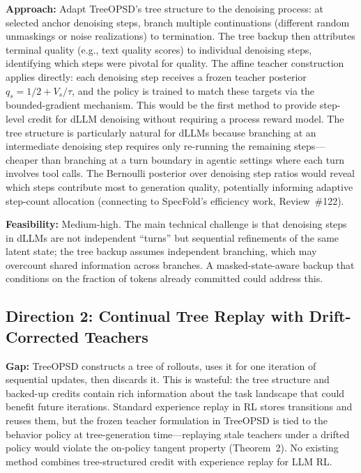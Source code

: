 \documentclass[11pt,a4paper]{article}
\begin{document}
\textbf{Approach:} Adapt TreeOPSD's tree structure to the denoising process: at selected anchor denoising steps, branch multiple continuations (different random unmaskings or noise realizations) to termination. The tree backup then attributes terminal quality (e.g., text quality scores) to individual denoising steps, identifying which steps were pivotal for quality. The affine teacher construction applies directly: each denoising step receives a frozen teacher posterior $q_s = 1/2 + V_s/\tau$, and the policy is trained to match these targets via the bounded-gradient mechanism. This would be the first method to provide step-level credit for dLLM denoising without requiring a process reward model. The tree structure is particularly natural for dLLMs because branching at an intermediate denoising step requires only re-running the remaining steps---cheaper than branching at a turn boundary in agentic settings where each turn involves tool calls. The Bernoulli posterior over denoising step ratios would reveal which steps contribute most to generation quality, potentially informing adaptive step-count allocation (connecting to SpecFold's efficiency work, Review~\#122).

\textbf{Feasibility:} Medium-high. The main technical challenge is that denoising steps in dLLMs are not independent ``turns'' but sequential refinements of the same latent state; the tree backup assumes independent branching, which may overcount shared information across branches. A masked-state-aware backup that conditions on the fraction of tokens already committed could address this.

\subsection{Direction 2: Continual Tree Replay with Drift-Corrected Teachers}
\textbf{Gap:} TreeOPSD constructs a tree of rollouts, uses it for one iteration of sequential updates, then discards it. This is wasteful: the tree structure and backed-up credits contain rich information about the task landscape that could benefit future iterations. Standard experience replay in RL stores transitions and reuses them, but the frozen teacher formulation in TreeOPSD is tied to the behavior policy at tree-generation time---replaying stale teachers under a drifted policy would violate the on-policy tangent property (Theorem~2). No existing method combines tree-structured credit with experience replay for LLM RL.
\end{document}
